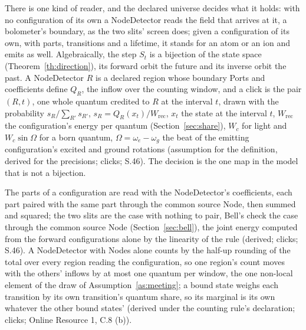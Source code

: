 \documentclass[pdflatex,sn-mathphys-num]{sn-jnl}
\newcommand{\Wc}{W_c}
\theoremstyle{thmstyleone}
\theoremstyle{thmstyletwo}
\begin{document}
There is one kind of reader, and the declared universe decides what it holds: with no configuration of its own a NodeDetector reads the field that arrives at it, a bolometer's boundary, as the two slits' screen does; given a configuration of its own, with parts, transitions and a lifetime, it stands for an atom or an ion and emits as well. Algebraically, the step $S_t$ is a bijection of the state space (Theorem~\ref{th:direction}), its forward orbit the future and its inverse orbit the past. A NodeDetector $R$ is a declared region whose boundary Ports and coefficients define $Q_R$, the inflow over the counting window, and a click is the pair $(R, t)$, one whole quantum credited to $R$ at the interval $t$, drawn with the probability $s_R / \sum_{R'} s_{R'}$, $s_R = Q_R(x_t) / W_{\mathrm{rec}}$, $x_t$ the state at the interval $t$, $W_{\mathrm{rec}}$ the configuration's energy per quantum (Section~\ref{sec:share}), $\Wc$ for light and $\Wc\sin\Omega$ for a born quantum, $\Omega = \omega_e - \omega_g$ the beat of the emitting configuration's excited and ground rotations (assumption for the definition, derived for the precisions; clicks; S.46). The decision is the one map in the model that is not a bijection.

The parts of a configuration are read with the NodeDetector's coefficients, each part paired with the same part through the common source Node, then summed and squared; the two slits are the case with nothing to pair, Bell's check the case through the common source Node (Section~\ref{sec:bell}), the joint energy computed from the forward configurations alone by the linearity of the rule (derived; clicks; S.46). A NodeDetector with Nodes alone counts by the half-up rounding of the total over every region reading the configuration, so one region's count moves with the others' inflows by at most one quantum per window, the one non-local element of the draw of Assumption~\ref{as:meeting}; a bound state weighs each transition by its own transition's quantum share, so its marginal is its own whatever the other bound states' (derived under the counting rule's declaration; clicks; Online Resource 1, C.8 (b)).
\end{document}

